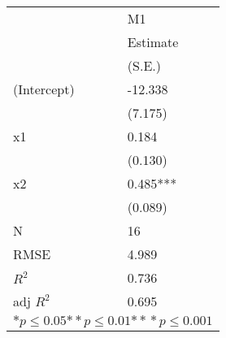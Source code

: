 \begin{tabular}{*{2}{l}}
\hline
                  & M1   \tabularnewline
                   &Estimate \tabularnewline
                 &(S.E.) \tabularnewline
 \hline
 \hline
   (Intercept)     &-12.338 \tabularnewline
                 &(7.175)  \tabularnewline
   x1              &0.184 \tabularnewline
                 &(0.130)  \tabularnewline
   x2              &0.485*** \tabularnewline
                 &(0.089)  \tabularnewline
 \hline
 N                 &16       \tabularnewline
 RMSE             &4.989   \tabularnewline
 $R^2$             &0.736   \tabularnewline
 adj $R^2$         &0.695   \tabularnewline
 \hline
\hline
 
 \multicolumn{2}{c}{${*  p}\le 0.05$${*\!\!*  p}\le 0.01$${*\!\!*\!\!*  p}\le 0.001$}\tabularnewline
 \end{tabular}
